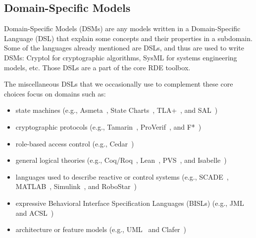 \documentclass[10pt,letterpaper]{article}
\begin{document}
\subsection{Domain-Specific Models}
\label{domain-specific-models}

Domain-Specific Models (DSMs) are any models written in a Domain-Specific Language (DSL) that explain some concepts and their properties in a subdomain. Some of the languages already mentioned are DSLs, and thus are used to write DSMs: Cryptol for cryptographic algorithms, SysML for systems engineering models, etc. Those DSLs are a part of the core RDE toolbox.

The miscellaneous DSLs that we occasionally use to complement these core choices focus on domains such as:

\begin{itemize}

    \item state machines (e.g., Asmeta~\cite{Asmeta}, State Charts~\cite{WelcomeWorld}, TLA+~\cite{LamportTLAHome}, and SAL~\cite{SymbolicAnalysis})
    
    \item cryptographic protocols (e.g., Tamarin~\cite{TamarinProver}, ProVerif~\cite{ProVerifCryptographic}, and F*~\cite{ProofOrientedProgramming})
    
    \item role-based access control (e.g., Cedar~\cite{AmazonWebServicesCedarPolicy})
    
    \item general logical theories (e.g., Coq/Roq~\cite{CoqProof}, Lean~\cite{LeanProgramming}, PVS~\cite{PrototypeVerification}, and Isabelle~\cite{Isabelle})
    
    \item languages used to describe reactive or control systems (e.g., SCADE~\cite{AnsysSCADE}, MATLAB~\cite{TheMathWorksInc.MATLAB}, Simulink~\cite{TheMathWorksInc.SimulinkSimulation}, and RoboStar~\cite{RoboStar})
    
    \item expressive Behavioral Interface Specification Languages (BISLs) (e.g., JML~\cite{OpenJML} and ACSL~\cite{ANSIISO})
    
    \item architecture or feature models (e.g., UML~\cite{UnifiedModeling} and Clafer~\cite{ClaferLightweight})

\end{itemize}
\end{document}
